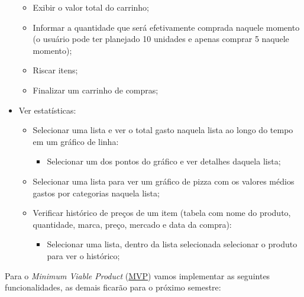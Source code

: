 \begin{itemize}
\begin{itemize}
			\item Exibir o valor total do carrinho;
			\item Informar a quantidade que será efetivamente comprada naquele momento (o usuário pode ter planejado 10 unidades e apenas comprar 5 naquele momento);
			\item Riscar itens;
			\item Finalizar um carrinho de compras;
		\end{itemize}
	\item Ver estatísticas:
		\begin{itemize}
			\item Selecionar uma lista e ver o total gasto naquela lista ao longo do tempo em um gráfico de linha:
				\begin{itemize}
					\item Selecionar um dos pontos do gráfico e ver detalhes daquela lista;
				\end{itemize}
			\item Selecionar uma lista para ver um gráfico de pizza com os valores médios gastos por categorias naquela lista;
			\item Verificar histórico de preços de um item (tabela com nome do produto, quantidade, marca, preço, mercado e data da compra):
				\begin{itemize}
					\item Selecionar uma lista, dentro da lista selecionada selecionar o produto para ver o histórico;
				\end{itemize}
		\end{itemize}
\end{itemize}

Para o \textit{Minimum Viable Product} (\label{sig:mvp}\hyperlink{s:mvp}{MVP}) vamos implementar as seguintes funcionalidades, as demais ficarão para o próximo semestre:

